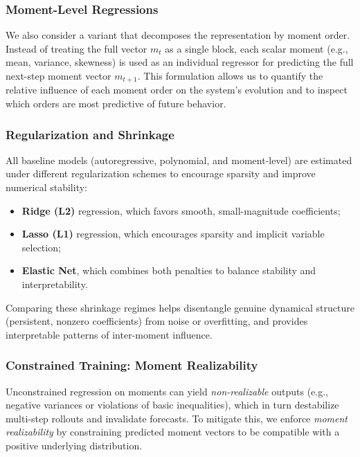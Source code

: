 \documentclass[journal, onecolumn]{IEEEtran}
\begin{document}
\subsubsection{Moment-Level Regressions}

We also consider a variant that decomposes the representation by moment order. Instead of treating the full vector $m_t$ as a single block, each scalar moment (e.g., mean, variance, skewness) is used as an individual regressor for predicting the full next-step moment vector $m_{t+1}$. This formulation allows us to quantify the relative influence of each moment order on the system’s evolution and to inspect which orders are most predictive of future behavior.

\subsubsection{Regularization and Shrinkage}

All baseline models (autoregressive, polynomial, and moment-level) are estimated under different regularization schemes to encourage sparsity and improve numerical stability:
\begin{itemize}
    \item \textbf{Ridge (L2)} regression, which favors smooth, small-magnitude coefficients;
    \item \textbf{Lasso (L1)} regression, which encourages sparsity and implicit variable selection;
    \item \textbf{Elastic Net}, which combines both penalties to balance stability and interpretability.
\end{itemize}
Comparing these shrinkage regimes helps disentangle genuine dynamical structure (persistent, nonzero coefficients) from noise or overfitting, and provides interpretable patterns of inter-moment influence.

\subsubsection{Constrained Training: Moment Realizability}

Unconstrained regression on moments can yield \emph{non-realizable} outputs (e.g., negative variances or violations of basic inequalities), which in turn destabilize multi-step rollouts and invalidate forecasts. To mitigate this, we enforce \emph{moment realizability} by constraining predicted moment vectors to be compatible with a positive underlying distribution.
\end{document}
